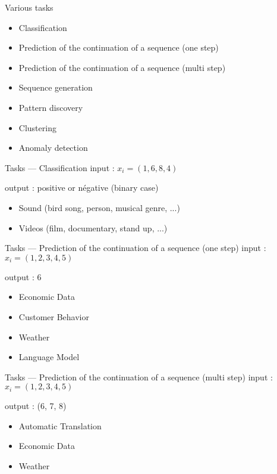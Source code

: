 \begin{frame}{Various tasks}
  \begin{itemize}
    \item Classification
    \item Prediction of the continuation of a sequence (one step)
    \item Prediction of the continuation of a sequence (multi step)
    \item Sequence generation
    \item Pattern discovery
    \item Clustering
    \item Anomaly detection
  \end{itemize}
\end{frame}

\begin{frame}{Tasks --- Classification}
  input : $x_i=(1,6,8,4)$

  output : positive or négative (binary case)

  \begin{itemize}
    \item Sound (bird song, person, musical genre, ...)
    \item Videos (film, documentary, stand up, ...)
  \end{itemize}
\end{frame}

\begin{frame}{Tasks --- Prediction of the continuation of a sequence (one step)}
  input : $x_i=(1,2,3,4,5)$

  output : 6

  \begin{itemize}
    \item Economic Data
    \item Customer Behavior
    \item Weather
    \item Language Model
  \end{itemize}
\end{frame}

\begin{frame}{Tasks --- Prediction of the continuation of a sequence (multi step)}
  input : $x_i=(1,2,3,4,5)$

  output : (6, 7, 8)

  \begin{itemize}
    \item Automatic Translation
    \item Economic Data
    \item Weather
  \end{itemize}
\end{frame}

